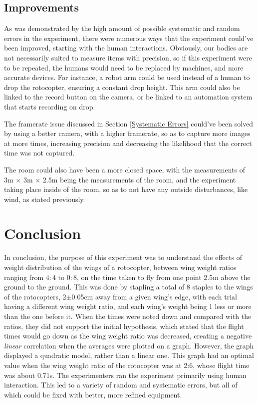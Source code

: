 \documentclass[]{article}
\theoremstyle{definition}
\begin{document}
\subsection{Improvements}
As was demonstrated by the high amount of possible systematic and random errors in the experiment, there were numerous ways that the experiment could've been improved, starting with the human interactions. Obviously, our bodies are not necessarily suited to measure items with precision, so if this experiment were to be repeated, the humans would need to be replaced by machines, and more accurate devices. For instance, a robot arm could be used instead of a human to drop the rotocopter, ensuring a constant drop height. This arm could also be linked to the record button on the camera, or be linked to an automation system that starts recording on drop.

The framerate issue discussed in Section \ref{Systematic Errors} could've been solved by using a better camera, with a higher framerate, so as to capture more images at more times, increasing precision and decreasing the likelihood that the correct time was not captured.

The room could also have been a more closed space, with the measurements of 3m $\times$ 3m $\times$ 2.5m being the measurements of the room, and the experiment taking place inside of the room, so as to not have any outside disturbances, like wind, as stated previously.

\section{Conclusion}
In conclusion, the purpose of this experiment was to understand the effects of weight distribution of the wings of a rotocopter, between wing weight ratios ranging from $4:4$ to $0:8$, on the time taken to fly from one point 2.5m above the ground to the ground. This was done by stapling a total of 8 staples to the wings of the rotocopters, 2$\pm$0.05cm away from a given wing's edge, with each trial having a different wing weight ratio, and each wing's weight being 1 less or more than the one before it. When the times were noted down and compared with the ratios, they did not support the initial hypothesis, which stated that the flight times would go down as the wing weight ratio was decreased, creating a negative \textit{linear} correlation when the averages were plotted on a graph. However, the graph displayed a quadratic model, rather than a linear one. This graph had an optimal value when the wing weight ratio of the rotocopter was at 2:6, whose flight time was about 0.71s. The experimenters ran the experiment primarily using human interaction. This led to a variety of random and systematic errors, but all of which could be fixed with better, more refined equipment.
\end{document}
